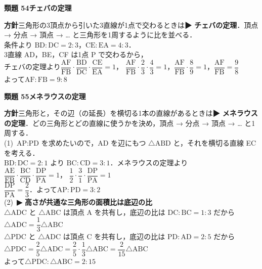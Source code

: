 \documentclass[a4paper,11pt]{ltjsarticle}
\newcommand{\ans}[2]{\Needspace{5\baselineskip}\vspace{6pt}%
  {\sffamily\bfseries 類題 #1\quad #2}\par}
\newcommand{\point}[1]{\textsf{\bfseries ▶ #1}}
\begin{document}
\ans{54}{チェバの定理}
\begin{kai}
\textbf{方針}\quad 三角形の3頂点から引いた3直線が1点で交わるときは\point{チェバの定理}．頂点 → 分点 → 頂点 → … と三角形を1周するように比を並べる．\\[2pt]
条件より $\mathrm{BD}:\mathrm{DC}=2:3$，\quad $\mathrm{CE}:\mathrm{EA}=4:3$．\\
3直線 AD，BE，CF は1点 P で交わるから，\\
チェバの定理より\quad $\dfrac{\mathrm{AF}}{\mathrm{FB}}\cdot\dfrac{\mathrm{BD}}{\mathrm{DC}}\cdot\dfrac{\mathrm{CE}}{\mathrm{EA}}=1$，\quad
$\dfrac{\mathrm{AF}}{\mathrm{FB}}\cdot\dfrac23\cdot\dfrac43=1$，\quad $\dfrac{\mathrm{AF}}{\mathrm{FB}}\cdot\dfrac89=1$，\quad $\dfrac{\mathrm{AF}}{\mathrm{FB}}=\dfrac98$\\
よって\quad $\mathrm{AF}:\mathrm{FB}=9:8$
\end{kai}

\ans{55}{メネラウスの定理}
\begin{kai}
\textbf{方針}\quad 三角形と，その辺（の延長）を横切る1本の直線があるときは\point{メネラウスの定理}．どの三角形とどの直線に使うかを決め，頂点 → 分点 → 頂点 → … と1周する．\\[2pt]
(1)\ AP:PD を求めたいので，AD を辺にもつ $\triangle\mathrm{ABD}$ と，それを横切る直線 EC を考える．\\
\hspace*{1.5em}$\mathrm{BD}:\mathrm{DC}=2:1$ より $\mathrm{BC}:\mathrm{CD}=3:1$．メネラウスの定理より\\
\hspace*{1.5em}
$\dfrac{\mathrm{AE}}{\mathrm{EB}}\cdot\dfrac{\mathrm{BC}}{\mathrm{CD}}\cdot\dfrac{\mathrm{DP}}{\mathrm{PA}}=1$，\quad
$\dfrac12\cdot\dfrac31\cdot\dfrac{\mathrm{DP}}{\mathrm{PA}}=1$\\
\hspace*{1.5em}$\dfrac{\mathrm{DP}}{\mathrm{PA}}=\dfrac23$．\quad よって\quad $\mathrm{AP}:\mathrm{PD}=3:2$\\[2pt]
(2)\ \point{高さが共通な三角形の面積比は底辺の比}\\
\hspace*{1.5em}$\triangle\mathrm{ADC}$ と $\triangle\mathrm{ABC}$ は頂点 A を共有し，底辺の比は $\mathrm{DC}:\mathrm{BC}=1:3$ だから\quad $\triangle\mathrm{ADC}=\dfrac13\triangle\mathrm{ABC}$\\
\hspace*{1.5em}$\triangle\mathrm{PDC}$ と $\triangle\mathrm{ADC}$ は頂点 C を共有し，底辺の比は $\mathrm{PD}:\mathrm{AD}=2:5$ だから\\
\hspace*{1.5em}\quad $\triangle\mathrm{PDC}=\dfrac25\triangle\mathrm{ADC}=\dfrac25\cdot\dfrac13\triangle\mathrm{ABC}=\dfrac{2}{15}\triangle\mathrm{ABC}$\\
\hspace*{1.5em}よって\quad $\triangle\mathrm{PDC}:\triangle\mathrm{ABC}=2:15$
\end{kai}
\end{document}
